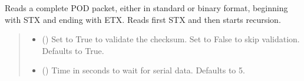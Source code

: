 \documentclass[letterpaper,10pt,english]{sphinxmanual}
\begin{document}
\begin{fulllineitems}
\begin{fulllineitems}
\begin{quote}
\begin{description}
\end{description}\end{quote}

\end{fulllineitems}


\begin{fulllineitems}
\label{\detokenize{Morelia.Devices:Morelia.Devices.BasicPodProtocol.Pod.ReadPODpacket}}
\pysigstartsignatures
{}
\pysigstopsignatures
\sphinxAtStartPar
Reads a complete POD packet, either in standard or binary format, beginning with STX and         ending with ETX. Reads first STX and then starts recursion.
\begin{quote}\begin{description}
\begin{itemize}
\item {} 
\sphinxAtStartPar
{} (\sphinxstyleliteralemphasis{\sphinxupquote{, }}) \textendash{} Set to True to validate the checksum. Set to False to                 skip validation. Defaults to True.

\item {} 
\sphinxAtStartPar
{} (\sphinxstyleliteralemphasis{\sphinxupquote{|}}\sphinxstyleliteralemphasis{\sphinxupquote{, }}) \textendash{} Time in seconds to wait for serial data.                 Defaults to 5.

\end{itemize}


\end{description}
\end{quote}
\end{fulllineitems}
\end{fulllineitems}
\end{document}
